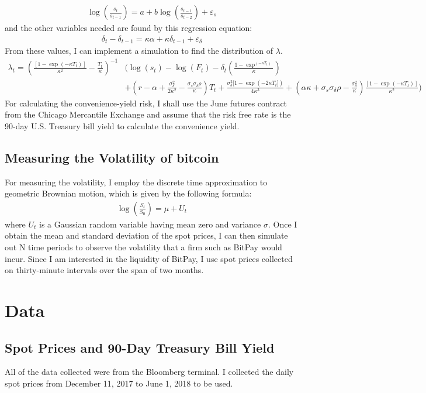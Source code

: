 \documentclass{paper}
\begin{document}
\begin{doublespacing}
\begin{align}
\log\left(\frac{s_{t}}{s_{t-1}}\right) = a + b\log\left(\frac{s_{t-1}}{s_{t-2}}\right) + \varepsilon_{s} \label{ornstein}
\end{align}
and the other variables needed are found by this regression equation:
\begin{align}
\delta_{t} - \delta_{t-1} = \kappa\alpha + \kappa\delta_{t-1}+\varepsilon_{\delta} \label{delta}
\end{align}
From these values, I can implement a simulation to find the distribution of $\lambda$. 
\begin{align}
\lambda_{t} = \left(\frac{[1-\exp(-\kappa T_{t})]}{\kappa^{2}}-\frac{T_{t}}{\kappa}\right)^{-1}&\Bigg(\log(s_{t})-\log(F_{t}) -\delta_{t}\left(\frac{1-\exp^(-\kappa T_{t})}{\kappa}\right)\nonumber\\
&+ \left(r-\alpha +\frac{\sigma^{2}_{\delta}}{2\kappa^{2}} - \frac{\sigma_{s}\sigma_{\delta}\rho}{\kappa}\right)T_{t}+ \frac{\sigma^{2}_{\delta}[1-\exp(-2\kappa T_{t}])}{4\kappa^{3}}+ \left(\alpha\kappa + \sigma_{s}\sigma_{\delta}\rho - \frac{\sigma^{2}_{\delta}}{\kappa} \right)\frac{[1-\exp(-\kappa T_{t})]}{\kappa^{2}}\Bigg)\label{lambda}
\end{align}
For calculating the convenience-yield risk, I shall use the June futures contract from the Chicago Mercantile Exchange and assume that the risk free rate is the 90-day U.S. Treasury bill yield to calculate the convenience yield.
\subsection{Measuring the Volatility of bitcoin}
For measuring the volatility, I employ the discrete time approximation to geometric Brownian motion, which is given by the following formula:
\begin{align}
\log\left(\frac{S_{t}}{S_{0}}\right) = \mu + U_{t}\label{brown}
\end{align}
where $U_{t}$ is a Gaussian random variable having mean zero and variance $\sigma$. Once I obtain the mean and standard deviation of the spot prices, I can then simulate out N time periods to observe the volatility that a firm such as BitPay would incur. Since I am interested in the liquidity of BitPay, I use spot prices collected on thirty-minute intervals over the span of two months.
\section{Data}
\subsection{Spot Prices and 90-Day Treasury Bill Yield}
All of the data collected were from the Bloomberg terminal. I collected the daily spot prices from December 11, 2017 to June 1, 2018 to be used.


\end{doublespacing}
\end{document}
